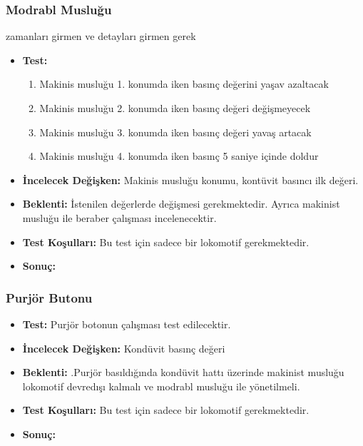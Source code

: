\documentclass[10pt,a4paper]{article}
\begin{document}
\subsubsection{Modrabl Musluğu}
zamanları girmen ve detayları girmen gerek
\begin{itemize}
\item \textbf{Test:} 
\begin{enumerate}
\item Makinis musluğu 1. konumda iken basınç değerini yaşav azaltacak
\item Makinis musluğu 2. konumda iken basınç değeri değişmeyecek
\item Makinis musluğu 3. konumda iken basınç değeri yavaş artacak
\item Makinis musluğu 4. konumda iken basınç 5 saniye içinde doldur
\end{enumerate}
\item \textbf{İncelecek Değişken:} Makinis musluğu konumu, kontüvit basıncı ilk değeri.\\
\item \textbf{Beklenti:} İstenilen değerlerde değişmesi gerekmektedir. Ayrıca makinist musluğu ile beraber çalışması incelenecektir.\\
\item \textbf{Test Koşulları:} Bu test için sadece bir lokomotif gerekmektedir. \\
\item \textbf{Sonuç:}
\end{itemize}

\subsubsection{Purjör Butonu}
\begin{itemize}
\item \textbf{Test:} Purjör botonun çalışması test edilecektir.\\
\item \textbf{İncelecek Değişken:} Kondüvit basınç değeri\\
\item \textbf{Beklenti:} .Purjör basıldığında kondüvit hattı üzerinde makinist musluğu lokomotif devredışı kalmalı ve modrabl musluğu ile yönetilmeli.\\
\item \textbf{Test Koşulları:} Bu test için sadece bir lokomotif gerekmektedir. \\
\item \textbf{Sonuç:}
\end{itemize}
\end{document}
